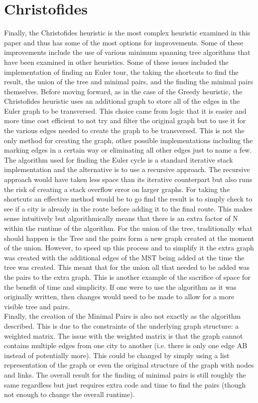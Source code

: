 \documentclass[midd]{thesis}
\newcommand{\tab}{\hspace*{2em}}
\begin{document}
\section{Christofides}
\tab Finally, the Christofides heuristic is the most complex heuristic examined in this paper and thus has some of the most options for improvements. Some of these improvements include the use of various minimum spanning tree algorithms that have been examined in other heuristics. Some of these issues included the implementation of finding an Euler tour, the taking the shortcuts to find the result, the union of the tree and minimal pairs, and the finding the minimal pairs themselves. Before moving forward, as in the case of the Greedy heuristic, the Christofides heuristic uses an additional graph to store all of the edges in the Euler graph to be transversed. This choice came from logic that it is easier and more time cost efficient to not try and filter the original graph but to use it for the various edges needed to create the graph to be transversed. This is not the only method for creating the graph, other possible implementations including the marking edges in a certain way or eliminating all other edges just to name a few.\\
\tab The algorithm used for finding the Euler cycle is a standard iterative stack implementation and the alternative is to use a recursive approach. The recursive approach would have taken less space than its iterative counterpart but also runs the risk of creating a stack overflow error on larger graphs. For taking the shortcuts an effective method would be to go find the result is to simply check to see if a city is already in the route before adding it to the final route. This makes sense intuitively but algorithmically means that there is an extra factor of N within the runtime of the algorithm. For the union of the tree, traditionally what should happen is the Tree and the pairs form a new graph created at the moment of the union. However, to speed up this process and to simplify it the extra graph was created with the additional edges of the MST being added at the time the tree was created. This meant that for the union all that needed to be added was the pairs to the extra graph. This is another example of the sacrifice of space for the benefit of time and simplicity. If one were to use the algorithm as it was originally written, then changes would need to be made to allow for a more visible tree and pairs.\\
\tab Finally, the creation of the Minimal Pairs is also not exactly as the algorithm described. This is due to the constraints of the underlying graph structure: a weighted matrix. The issue with the weighted matrix is that the graph cannot contains multiple edges from one city to another (i.e. there is only one edge AB instead of potentially more). This could be changed by simply using a list representation of the graph or even the original structure of the graph with nodes and links. The overall result for the finding of minimal pairs is still roughly the same regardless but just requires extra code and time to find the pairs (though not enough to change the overall runtime).\\
\end{document}
